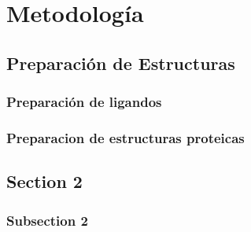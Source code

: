 \chapter{Metodología}
\label{ch2}

\section{Preparación de Estructuras}
    \subsection{Preparación de ligandos}
    \subsection{Preparacion de estructuras proteicas}

\section{Section 2}
    \subsection{Subsection 2}